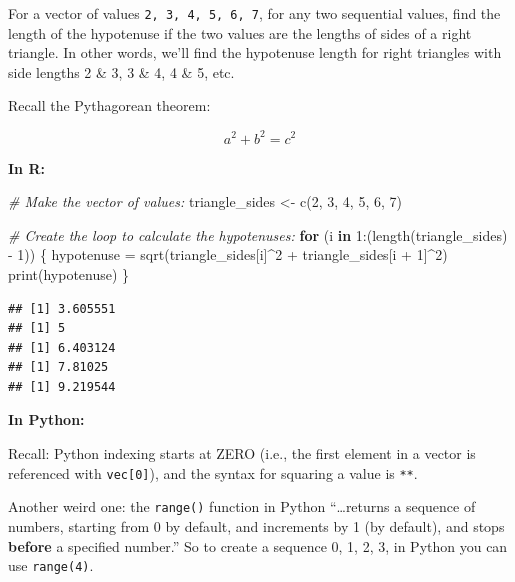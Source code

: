 \documentclass[
]{book}
\newenvironment{Shaded}{\begin{snugshade}}{\end{snugshade}}
\newcommand{\CommentTok}[1]{\textcolor[rgb]{0.56,0.35,0.01}{\textit{#1}}}
\newcommand{\ControlFlowTok}[1]{\textcolor[rgb]{0.13,0.29,0.53}{\textbf{#1}}}
\newcommand{\DecValTok}[1]{\textcolor[rgb]{0.00,0.00,0.81}{#1}}
\newcommand{\FunctionTok}[1]{\textcolor[rgb]{0.00,0.00,0.00}{#1}}
\newcommand{\NormalTok}[1]{#1}
\newcommand{\OtherTok}[1]{\textcolor[rgb]{0.56,0.35,0.01}{#1}}
\newcommand{\SpecialCharTok}[1]{\textcolor[rgb]{0.00,0.00,0.00}{#1}}
\begin{document}
For a vector of values \texttt{2,\ 3,\ 4,\ 5,\ 6,\ 7}, for any two sequential values, find the length of the hypotenuse if the two values are the lengths of sides of a right triangle. In other words, we'll find the hypotenuse length for right triangles with side lengths 2 \& 3, 3 \& 4, 4 \& 5, etc.

Recall the Pythagorean theorem:

\[a^2 + b^2 = c^2\]

\textbf{In R:}

\begin{Shaded}
\begin{Highlighting}[]
\CommentTok{\# Make the vector of values: }
\NormalTok{triangle\_sides }\OtherTok{\textless{}{-}} \FunctionTok{c}\NormalTok{(}\DecValTok{2}\NormalTok{, }\DecValTok{3}\NormalTok{, }\DecValTok{4}\NormalTok{, }\DecValTok{5}\NormalTok{, }\DecValTok{6}\NormalTok{, }\DecValTok{7}\NormalTok{)}

\CommentTok{\# Create the loop to calculate the hypotenuses: }
\ControlFlowTok{for}\NormalTok{ (i }\ControlFlowTok{in} \DecValTok{1}\SpecialCharTok{:}\NormalTok{(}\FunctionTok{length}\NormalTok{(triangle\_sides) }\SpecialCharTok{{-}} \DecValTok{1}\NormalTok{)) \{}
\NormalTok{  hypotenuse }\OtherTok{=} \FunctionTok{sqrt}\NormalTok{(triangle\_sides[i]}\SpecialCharTok{\^{}}\DecValTok{2} \SpecialCharTok{+}\NormalTok{ triangle\_sides[i }\SpecialCharTok{+} \DecValTok{1}\NormalTok{]}\SpecialCharTok{\^{}}\DecValTok{2}\NormalTok{)}
  \FunctionTok{print}\NormalTok{(hypotenuse)}
\NormalTok{\}}
\end{Highlighting}
\end{Shaded}

\begin{verbatim}
## [1] 3.605551
## [1] 5
## [1] 6.403124
## [1] 7.81025
## [1] 9.219544
\end{verbatim}

\textbf{In Python:}

Recall: Python indexing starts at ZERO (i.e., the first element in a vector is referenced with \texttt{vec{[}0{]}}), and the syntax for squaring a value is \texttt{**}.

Another weird one: the \texttt{range()} function in Python ``\ldots returns a sequence of numbers, starting from 0 by default, and increments by 1 (by default), and stops \textbf{before} a specified number.'' So to create a sequence 0, 1, 2, 3, in Python you can use \texttt{range(4)}.
\end{document}

